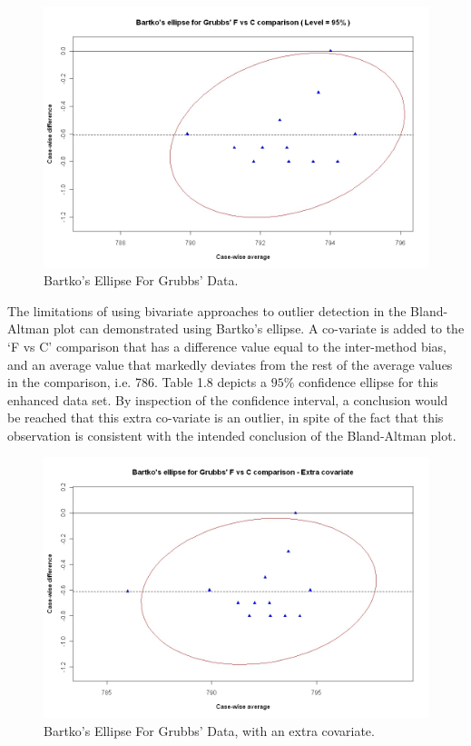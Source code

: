 \documentclass[Main.tex]{subfiles}
\begin{document}
	
	\begin{figure}[h!]
		\includegraphics[width=130mm]{images/GrubbsBartko.jpeg}
		\caption{Bartko's Ellipse For Grubbs' Data.}\label{GrubbsBartko}
	\end{figure}
	
	The limitations of using bivariate approaches to outlier detection
	in the Bland-Altman plot can demonstrated using Bartko's ellipse.
	A co-variate is added to the `F vs C' comparison that has a	difference value equal to the inter-method bias, and an average	value that markedly deviates from the rest of the average values in the comparison, i.e. 786. Table 1.8 depicts a $95\%$ confidence
	ellipse for this enhanced data set. By inspection of the confidence interval, a conclusion would be reached that this extra
	co-variate is an outlier, in spite of the fact that this observation is consistent with the intended conclusion of the
	Bland-Altman plot.
	
	\begin{figure}[h!]
		\includegraphics[width=130mm]{images/GrubbsBartko2.jpeg}
		\caption{Bartko's Ellipse For Grubbs' Data, with an extra covariate.}\label{GrubbsBartko2}
	\end{figure}
	
\end{document}

